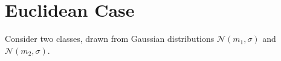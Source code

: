 \section{Euclidean Case}
Consider two classes, drawn from Gaussian distributions $\mathcal{N}(m_1, \sigma)$ and $\mathcal{N}(m_2, \sigma)$.